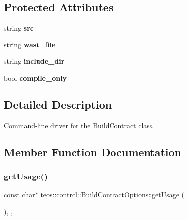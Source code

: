 \subsection*{Protected Attributes}
\begin{DoxyCompactItemize}
\item 
\mbox{\label{classteos_1_1control_1_1_build_contract_options_a80b02b6769efd16a94bc83e7991dc7db}} 
string {\bfseries src}
\item 
\mbox{\label{classteos_1_1control_1_1_build_contract_options_ae9784fdf0854b5ee6d9e9b2edf0b0345}} 
string {\bfseries wast\+\_\+file}
\item 
\mbox{\label{classteos_1_1control_1_1_build_contract_options_a4e5b55589b7062925301c383f5bb8bab}} 
string {\bfseries include\+\_\+dir}
\item 
\mbox{\label{classteos_1_1control_1_1_build_contract_options_a6a92e41ed58131c1358f9f9a9b69b71a}} 
bool {\bfseries compile\+\_\+only}
\end{DoxyCompactItemize}


\subsection{Detailed Description}
Command-\/line driver for the \mbox{\hyperlink{classteos_1_1control_1_1_build_contract}{Build\+Contract}} class. 

\subsection{Member Function Documentation}
\mbox{\label{classteos_1_1control_1_1_build_contract_options_ac45a323c2bc0c79b97b1d0d1d8afbf4f}} 
\subsubsection{\texorpdfstring{get\+Usage()}{getUsage()}}
{\footnotesize\ttfamily const char$\ast$ teos\+::control\+::\+Build\+Contract\+Options\+::get\+Usage (\begin{DoxyParamCaption}{ }\end{DoxyParamCaption})\hspace{0.3cm}{\ttfamily [inline]}, {\ttfamily [protected]}, {\ttfamily [virtual]}}



